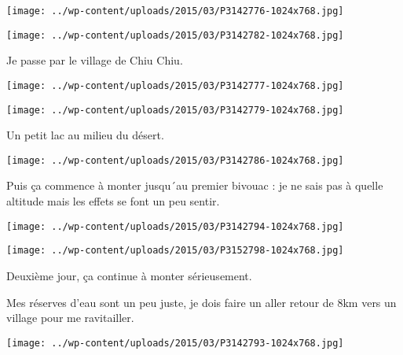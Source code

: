  

\begin{center} \texttt{[image: ../wp-content/uploads/2015/03/P3142776-1024x768.jpg]} \end{center}



\begin{center} \texttt{[image: ../wp-content/uploads/2015/03/P3142782-1024x768.jpg]} \end{center}

Je passe par le village de Chiu Chiu.

 

\begin{center} \texttt{[image: ../wp-content/uploads/2015/03/P3142777-1024x768.jpg]} \end{center}

 

\begin{center} \texttt{[image: ../wp-content/uploads/2015/03/P3142779-1024x768.jpg]} \end{center}

Un petit lac au milieu du désert.

 

\begin{center} \texttt{[image: ../wp-content/uploads/2015/03/P3142786-1024x768.jpg]} \end{center}

Puis ça commence à monter jusqu´au premier bivouac : je ne sais pas à quelle altitude mais les effets se font un peu sentir.

 

\begin{center} \texttt{[image: ../wp-content/uploads/2015/03/P3142794-1024x768.jpg]} \end{center}

 

\begin{center} \texttt{[image: ../wp-content/uploads/2015/03/P3152798-1024x768.jpg]} \end{center}

 

 Deuxième jour, ça continue à monter sérieusement.

 Mes réserves d'eau sont un peu juste, je dois faire un aller retour de 8km vers un village pour me ravitailler. 

 

\begin{center} \texttt{[image: ../wp-content/uploads/2015/03/P3142793-1024x768.jpg]} \end{center}

